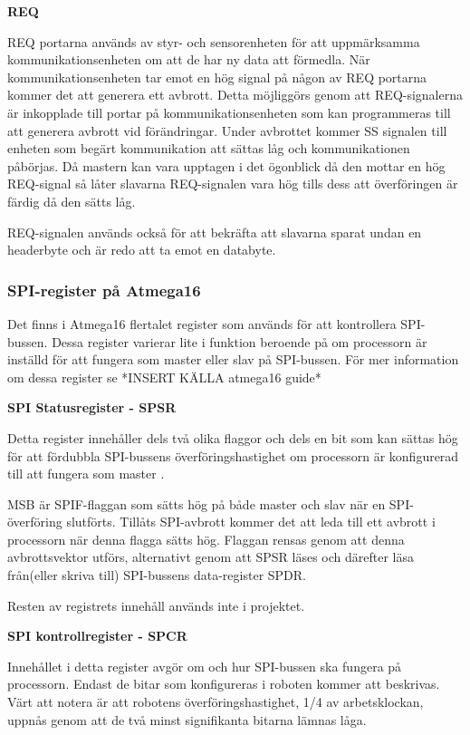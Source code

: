 \textbf{REQ}


REQ portarna används av styr- och sensorenheten för att uppmärksamma 
kommunikationsenheten om att de har ny data att förmedla. När 
kommunikationsenheten tar emot en hög signal på någon av REQ portarna kommer 
det att generera ett avbrott. Detta möjliggörs genom att REQ-signalerna är 
inkopplade till portar på kommunikationsenheten som kan programmeras till att 
generera avbrott vid förändringar. Under avbrottet kommer SS signalen till 
enheten som begärt kommunikation att sättas låg och kommunikationen påbörjas. 
Då mastern kan vara upptagen i det ögonblick då den mottar en hög REQ-signal 
så låter slavarna REQ-signalen vara hög tills dess att överföringen är färdig 
då den sätts låg.

REQ-signalen används också för att bekräfta att slavarna sparat undan en 
headerbyte och är redo att ta emot en databyte. 

\subsubsection{SPI-register på Atmega16}

Det finns i Atmega16 flertalet register som används för att kontrollera SPI-
bussen. Dessa register varierar lite i funktion beroende på om processorn är 
inställd för att fungera som master eller slav på SPI-bussen. För mer 
information om dessa register se *INSERT KÄLLA atmega16 guide*

\textbf{SPI Statusregister - SPSR}


Detta register innehåller dels två olika flaggor och dels en bit som kan 
sättas hög för att fördubbla SPI-bussens överföringshastighet om processorn 
är konfigurerad till att fungera som master . 

MSB är SPIF-flaggan som sätts hög på både master och slav när en 
SPI- överföring slutförts. Tillåts SPI-avbrott kommer 
det att leda till ett avbrott i processorn när denna flagga sätts hög. 
Flaggan rensas genom att denna avbrottsvektor utförs, alternativt genom att 
SPSR läses och därefter läsa från(eller skriva till) SPI-bussens data-register SPDR.

Resten av registrets innehåll används inte i projektet.

\textbf{SPI kontrollregister - SPCR}


Innehållet i detta register avgör om och hur SPI-bussen ska fungera på 
processorn. Endast de bitar som konfigureras i roboten kommer att beskrivas. 
Värt att notera är att robotens överföringshastighet, 1/4 av arbetsklockan, 
uppnås genom att de två minst signifikanta bitarna lämnas låga.

